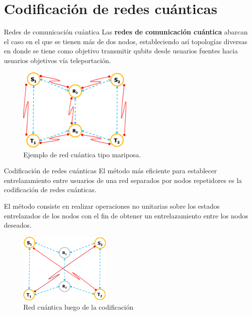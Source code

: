 \documentclass[10pt]{beamer}
\begin{document}
\section{Codificación de redes cuánticas}
\begin{frame}{Redes de comunicación cuántica}
  Las \textbf{redes de comunicación cuántica} abarcan el caso en el que se tienen más de dos nodos, estableciendo así topologías diversas en donde se tiene como objetivo transmitir qubits desde usuarios fuentes hacia usuarios objetivos vía teleportación.
  \begin{figure}
    \includegraphics[width=0.5\textwidth]{butterflyquantum.png}
    \caption{Ejemplo de red cuántica tipo mariposa.}
    \label{fig:butterfly1}
  \end{figure}%
\end{frame}
\begin{frame}{Codificación de redes cuánticas}
  El método más eficiente para establecer entrelazamiento entre usuarios de una red separados por nodos repetidores es la \alert{codificación de redes cuánticas}. \par
  El método consiste en realizar operaciones no unitarias sobre los estados entrelazados de los nodos con el fin de obtener un entrelazamiento entre los nodos deseados.
  \begin{figure}
    \includegraphics[width=0.4\textwidth]{butterflycoded.png}
    \caption{Red cuántica luego de la codificación}
  \end{figure}
\end{frame}
\end{document}
